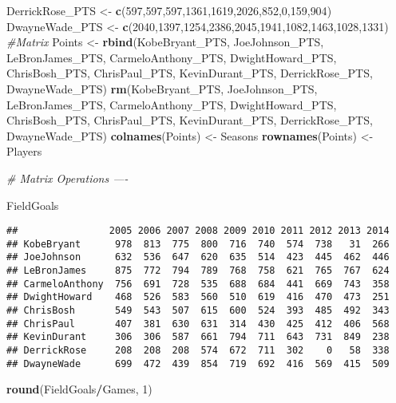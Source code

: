 \documentclass[
]{article}
\newenvironment{Shaded}{\begin{snugshade}}{\end{snugshade}}
\newcommand{\CommentTok}[1]{\textcolor[rgb]{0.56,0.35,0.01}{\textit{#1}}}
\newcommand{\DecValTok}[1]{\textcolor[rgb]{0.00,0.00,0.81}{#1}}
\newcommand{\KeywordTok}[1]{\textcolor[rgb]{0.13,0.29,0.53}{\textbf{#1}}}
\newcommand{\NormalTok}[1]{#1}
\newcommand{\OperatorTok}[1]{\textcolor[rgb]{0.81,0.36,0.00}{\textbf{#1}}}
\newcommand{\StringTok}[1]{\textcolor[rgb]{0.31,0.60,0.02}{#1}}
\begin{document}
\begin{Shaded}
\begin{Highlighting}[]
\NormalTok{DerrickRose_PTS <-}\StringTok{ }\KeywordTok{c}\NormalTok{(}\DecValTok{597}\NormalTok{,}\DecValTok{597}\NormalTok{,}\DecValTok{597}\NormalTok{,}\DecValTok{1361}\NormalTok{,}\DecValTok{1619}\NormalTok{,}\DecValTok{2026}\NormalTok{,}\DecValTok{852}\NormalTok{,}\DecValTok{0}\NormalTok{,}\DecValTok{159}\NormalTok{,}\DecValTok{904}\NormalTok{)}
\NormalTok{DwayneWade_PTS <-}\StringTok{ }\KeywordTok{c}\NormalTok{(}\DecValTok{2040}\NormalTok{,}\DecValTok{1397}\NormalTok{,}\DecValTok{1254}\NormalTok{,}\DecValTok{2386}\NormalTok{,}\DecValTok{2045}\NormalTok{,}\DecValTok{1941}\NormalTok{,}\DecValTok{1082}\NormalTok{,}\DecValTok{1463}\NormalTok{,}\DecValTok{1028}\NormalTok{,}\DecValTok{1331}\NormalTok{)}
\CommentTok{#Matrix}
\NormalTok{Points <-}\StringTok{ }\KeywordTok{rbind}\NormalTok{(KobeBryant_PTS, JoeJohnson_PTS, LeBronJames_PTS, CarmeloAnthony_PTS, DwightHoward_PTS, ChrisBosh_PTS, ChrisPaul_PTS, KevinDurant_PTS, DerrickRose_PTS, DwayneWade_PTS)}
\KeywordTok{rm}\NormalTok{(KobeBryant_PTS, JoeJohnson_PTS, LeBronJames_PTS, CarmeloAnthony_PTS, DwightHoward_PTS, ChrisBosh_PTS, ChrisPaul_PTS, KevinDurant_PTS, DerrickRose_PTS, DwayneWade_PTS)}
\KeywordTok{colnames}\NormalTok{(Points) <-}\StringTok{ }\NormalTok{Seasons}
\KeywordTok{rownames}\NormalTok{(Points) <-}\StringTok{ }\NormalTok{Players}


\CommentTok{# Matrix Operations ----}

\NormalTok{FieldGoals}
\end{Highlighting}
\end{Shaded}

\begin{verbatim}
##                2005 2006 2007 2008 2009 2010 2011 2012 2013 2014
## KobeBryant      978  813  775  800  716  740  574  738   31  266
## JoeJohnson      632  536  647  620  635  514  423  445  462  446
## LeBronJames     875  772  794  789  768  758  621  765  767  624
## CarmeloAnthony  756  691  728  535  688  684  441  669  743  358
## DwightHoward    468  526  583  560  510  619  416  470  473  251
## ChrisBosh       549  543  507  615  600  524  393  485  492  343
## ChrisPaul       407  381  630  631  314  430  425  412  406  568
## KevinDurant     306  306  587  661  794  711  643  731  849  238
## DerrickRose     208  208  208  574  672  711  302    0   58  338
## DwayneWade      699  472  439  854  719  692  416  569  415  509
\end{verbatim}

\begin{Shaded}
\begin{Highlighting}[]
\KeywordTok{round}\NormalTok{(FieldGoals}\OperatorTok{/}\NormalTok{Games, }\DecValTok{1}\NormalTok{)}
\end{Highlighting}
\end{Shaded}
\end{document}
